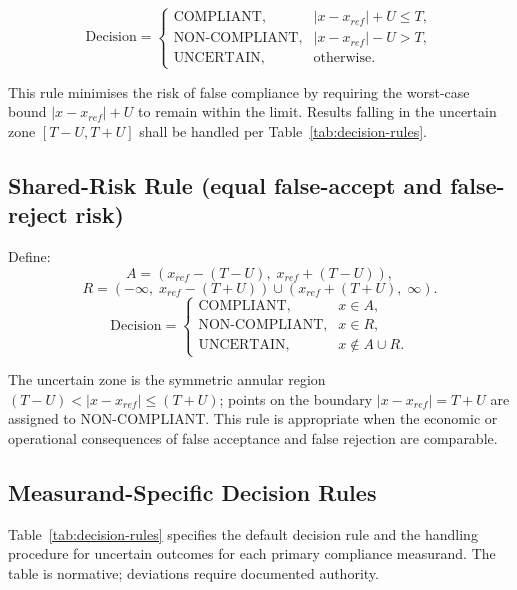 \documentclass[11pt]{article}
\begin{document}
\begin{equation}
\text{Decision} =
\begin{cases}
\text{COMPLIANT}, & |x - x_{ref}| + U \leq T, \\
\text{NON-COMPLIANT}, & |x - x_{ref}| - U > T, \\
\text{UNCERTAIN}, & \text{otherwise}.
\end{cases}
\label{eq:guardband}
\end{equation}

This rule minimises the risk of false compliance by requiring the worst-case bound $|x - x_{ref}| + U$ to remain within the limit. Results falling in the uncertain zone $[T-U, T+U]$ shall be handled per Table~\ref{tab:decision-rules}.

\subsection*{Shared-Risk Rule (equal false-accept and false-reject risk)}

Define:
\begin{equation}
A = \left(x_{ref} - (T-U),\; x_{ref} + (T-U)\right),
\end{equation}
\begin{equation}
R = \left(-\infty,\; x_{ref} - (T+U)\right) \cup \left(x_{ref} + (T+U),\; \infty\right).
\end{equation}
\begin{equation}
\text{Decision} =
\begin{cases}
\text{COMPLIANT}, & x \in A, \\
\text{NON-COMPLIANT}, & x \in R, \\
\text{UNCERTAIN}, & x \notin A \cup R.
\end{cases}
\label{eq:sharedrisk}
\end{equation}

The uncertain zone is the symmetric annular region $(T-U) < |x - x_{ref}| \leq (T+U)$; points on the boundary $|x - x_{ref}| = T+U$ are assigned to NON-COMPLIANT. This rule is appropriate when the economic or operational consequences of false acceptance and false rejection are comparable.

\subsection*{Measurand-Specific Decision Rules}

Table~\ref{tab:decision-rules} specifies the default decision rule and the handling procedure for uncertain outcomes for each primary compliance measurand. The table is normative; deviations require documented authority.
\end{document}
